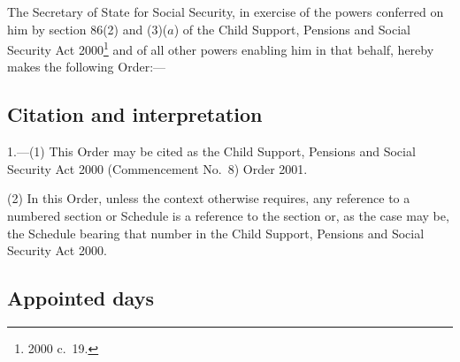 \documentclass[12pt,a4paper]{article}
\title{\regstitle}
\author{S.I.\ 2001 No.\ 1252 (C.\ 45)}
\date{Made
28th March 2001\\
}
\begin{document}
\maketitle

\noindent
The Secretary of State for Social Security, in exercise of the powers conferred on him by section 86(2) and (3)($a$)  of the Child Support, Pensions and Social Security Act 2000\footnote{2000 c.\ 19.} and of all other powers enabling him in that behalf, hereby makes the following Order:— 

{\sloppy

\tableofcontents

}

\bigskip

\setcounter{secnumdepth}{-2}

\subsection[1. Citation and interpretation]{Citation and interpretation}

1.---(1)  This Order may be cited as the Child Support, Pensions and Social Security Act 2000 (Commencement No.\ 8) Order 2001.

(2) In this Order, unless the context otherwise requires, any reference to a numbered section or Schedule is a reference to the section or, as the case may be, the Schedule bearing that number in the Child Support, Pensions and Social Security Act 2000.

\subsection[2. Appointed days]{Appointed days}
\end{document}
